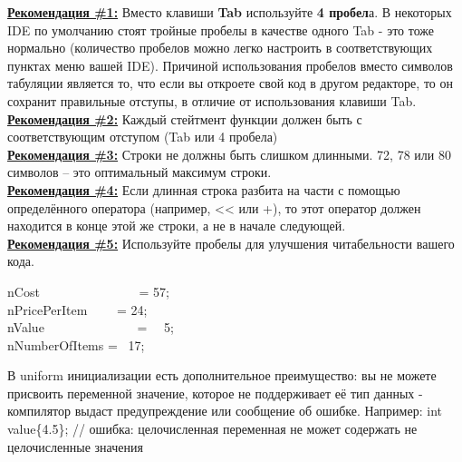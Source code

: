 \documentclass[a4paper,16pt]{report} %
\begin{document}
\begin{flushleft}
	\textbf{\underline{Рекомендация \#1:}} Вместо клавиши \textbf{Tab} используйте \textbf{4 пробел}а. В некоторых IDE по умолчанию стоят тройные пробелы в качестве одного Tab - это тоже нормально (количество пробелов можно легко настроить в соответствующих пунктах меню вашей IDE).
Причиной использования пробелов вместо символов табуляции является то, что если вы откроете свой код в другом редакторе, то он сохранит правильные отступы, в отличие от использования клавиши Tab.
\\
\textbf{\underline{Рекомендация \#2:}} Каждый стейтмент функции должен быть с
соответствующим отступом (Tab или 4 пробела)
\\
\textbf{\underline{Рекомендация \#3:}} Строки не должны быть слишком длинными. 72, 78 или 80 символов – это оптимальный максимум строки.
\\
\textbf{\underline{Рекомендация \#4:}} Если длинная строка разбита на части с помощью определённого оператора (например, << или +), то этот оператор должен находится в конце этой же строки, а не в начале следующей.
\\
\textbf{\underline{Рекомендация \#5:}} Используйте пробелы для улучшения читабельности вашего кода.
\end{flushleft}


\begin{flushleft}
nCost \ \ \ \ \ \ \ \ \ \ \ \ \ \ \ = 57;\\
nPricePerItem \ \ \ \  = 24;\\
nValue \ \ \ \ \ \ \ \ \ \ \ \ \ \ = \ \ 5;\\
nNumberOfItems = \ 17;\\
\end{flushleft}

\begin{sloppypar}
	В uniform инициализации есть дополнительное преимущество: вы не можете присвоить переменной значение, которое не поддерживает её тип данных - компилятор выдаст предупреждение или сообщение об ошибке. Например: int value\{4.5\}; // ошибка: целочисленная переменная не может содержать не целочисленные значения
\end{sloppypar}
\end{document}
